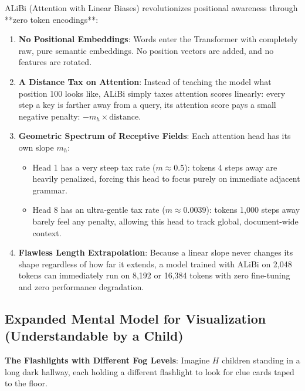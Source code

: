 \documentclass[11pt,a4paper]{article}
\theoremstyle{definition}
\begin{document}
ALiBi (Attention with Linear Biases) revolutionizes positional awareness through **zero token encodings**:
\begin{enumerate}
    \item \textbf{No Positional Embeddings}: Words enter the Transformer with completely raw, pure semantic embeddings. No position vectors are added, and no features are rotated.
    \item \textbf{A Distance Tax on Attention}: Instead of teaching the model what position 100 looks like, ALiBi simply taxes attention scores linearly: every step a key is farther away from a query, its attention score pays a small negative penalty: $-m_h \times \text{distance}$.
    \item \textbf{Geometric Spectrum of Receptive Fields}: Each attention head has its own slope $m_h$:
    \begin{itemize}
        \item Head 1 has a very steep tax rate ($m \approx 0.5$): tokens 4 steps away are heavily penalized, forcing this head to focus purely on immediate adjacent grammar.
        \item Head 8 has an ultra-gentle tax rate ($m \approx 0.0039$): tokens 1,000 steps away barely feel any penalty, allowing this head to track global, document-wide context.
    \end{itemize}
    \item \textbf{Flawless Length Extrapolation}: Because a linear slope never changes its shape regardless of how far it extends, a model trained with ALiBi on 2,048 tokens can immediately run on 8,192 or 16,384 tokens with zero fine-tuning and zero performance degradation.
\end{enumerate}

\subsection{Expanded Mental Model for Visualization (Understandable by a Child)}
\textbf{The Flashlights with Different Fog Levels}:
Imagine $H$ children standing in a long dark hallway, each holding a different flashlight to look for clue cards taped to the floor.
\end{document}
